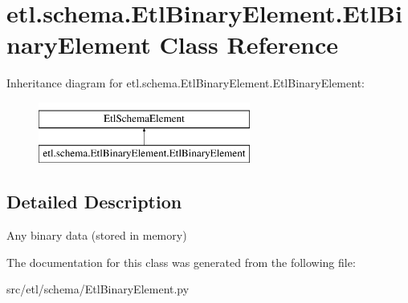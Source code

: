 \hypertarget{classetl_1_1schema_1_1EtlBinaryElement_1_1EtlBinaryElement}{\section{etl.\-schema.\-Etl\-Binary\-Element.\-Etl\-Binary\-Element Class Reference}
\label{classetl_1_1schema_1_1EtlBinaryElement_1_1EtlBinaryElement}
}
Inheritance diagram for etl.\-schema.\-Etl\-Binary\-Element.\-Etl\-Binary\-Element\-:\begin{figure}[H]
\begin{center}
\leavevmode
\includegraphics[height=2.000000cm]{classetl_1_1schema_1_1EtlBinaryElement_1_1EtlBinaryElement}
\end{center}
\end{figure}


\subsection{Detailed Description}
\begin{DoxyVerb}Any binary data (stored in memory)\end{DoxyVerb}
 

The documentation for this class was generated from the following file\-:\begin{DoxyCompactItemize}
\item 
src/etl/schema/Etl\-Binary\-Element.\-py\end{DoxyCompactItemize}
